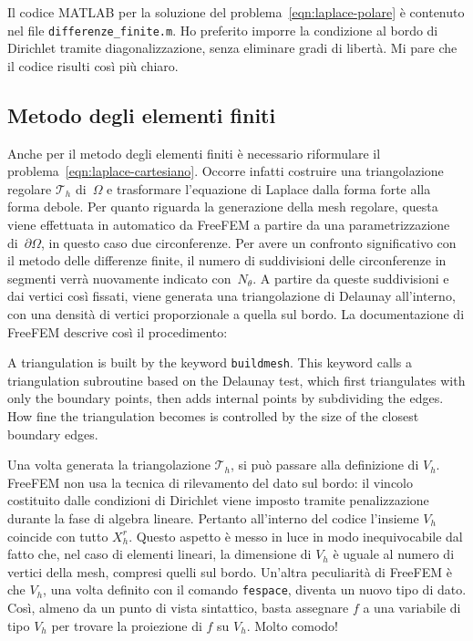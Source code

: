 \documentclass[a4paper]{article}
\begin{document}
Il codice MATLAB per la soluzione del problema~\eqref{eqn:laplace-polare}
è contenuto nel file \texttt{differenze\_finite.m}.
Ho preferito imporre la condizione al bordo di Dirichlet tramite diagonalizzazione,
senza eliminare gradi di libertà. Mi pare che il codice risulti così più chiaro.

\subsection{Metodo degli elementi finiti}
Anche per il metodo degli elementi finiti è necessario riformulare
il problema~\eqref{eqn:laplace-cartesiano}. Occorre infatti
costruire una triangolazione regolare $\mathcal{T}_h$ di~$\Omega$ e trasformare
l'equazione di Laplace dalla forma forte alla forma debole.
Per quanto riguarda la generazione della mesh regolare, questa viene effettuata in
automatico da FreeFEM a partire da una parametrizzazione di~$\partial\Omega$,
in questo caso due circonferenze.
Per avere un confronto significativo con il metodo delle differenze finite,
il numero di suddivisioni delle circonferenze in segmenti verrà nuovamente
indicato con~$N_\theta$.
A partire da queste suddivisioni e dai vertici così fissati,
viene generata una triangolazione di Delaunay all'interno,
con una densità di vertici proporzionale a quella sul bordo.
La documentazione di FreeFEM descrive così il procedimento:
\begin{quoting}
A triangulation is built by the keyword \texttt{buildmesh}.
This keyword calls a triangulation subroutine based on the Delaunay test,
which first triangulates with only the boundary points,
then adds internal points by subdividing the edges.
How fine the triangulation becomes is controlled by the size
of the closest boundary edges.
\end{quoting}
Una volta generata la triangolazione $\mathcal{T}_h$,
si può passare alla definizione di $V_h$.
FreeFEM non usa la tecnica di rilevamento del dato sul bordo:
il vincolo costituito dalle condizioni di Dirichlet viene imposto tramite
penalizzazione durante la fase di algebra lineare.
Pertanto all'interno del codice l'insieme $V_h$ coincide con tutto $X_h^r$.
Questo aspetto è messo in luce in modo inequivocabile dal fatto che,
nel caso di elementi lineari, la dimensione di $V_h$ è uguale al
numero di vertici della mesh, compresi quelli sul bordo.
Un'altra peculiarità di FreeFEM è che $V_h$, una volta definito
con il comando \texttt{fespace}, diventa un nuovo tipo di dato.
Così, almeno da un punto di vista sintattico, basta assegnare $f$ a
una variabile di tipo $V_h$ per trovare la proiezione di $f$ su $V_h$. Molto comodo!
\end{document}
